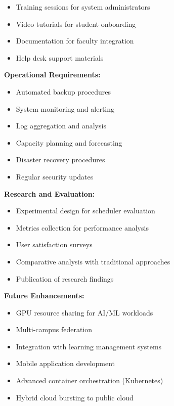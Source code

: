 \documentclass[12pt,a4paper]{article}
\begin{document}
\begin{itemize}
    \item Training sessions for system administrators
    \item Video tutorials for student onboarding
    \item Documentation for faculty integration
    \item Help desk support materials
\end{itemize}

\textbf{Operational Requirements:}

\begin{itemize}
    \item Automated backup procedures
    \item System monitoring and alerting
    \item Log aggregation and analysis
    \item Capacity planning and forecasting
    \item Disaster recovery procedures
    \item Regular security updates
\end{itemize}

\textbf{Research and Evaluation:}

\begin{itemize}
    \item Experimental design for scheduler evaluation
    \item Metrics collection for performance analysis
    \item User satisfaction surveys
    \item Comparative analysis with traditional approaches
    \item Publication of research findings
\end{itemize}

\textbf{Future Enhancements:}

\begin{itemize}
    \item GPU resource sharing for AI/ML workloads
    \item Multi-campus federation
    \item Integration with learning management systems
    \item Mobile application development
    \item Advanced container orchestration (Kubernetes)
    \item Hybrid cloud bursting to public cloud
\end{itemize}
\end{document}
